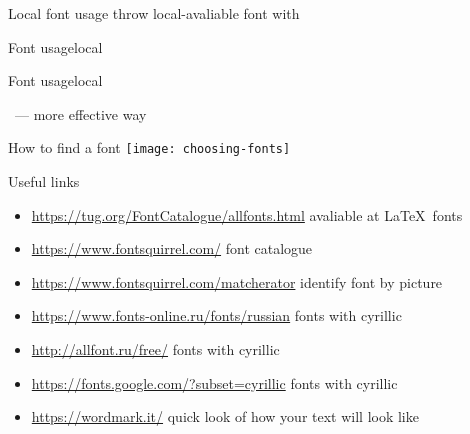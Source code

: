 \begin{frame}

    \magicPage
     \centering\huge Local font usage throw local-avaliable font with \XeLaTeX
\end{frame}

\begin{frame}[fragile]{Font usage\magicPage}{local}\relax

    \ccol{}

\end{frame}

\begin{frame}[fragile]{Font usage\magicPage\preMagicPage}{local}\relax

    \ccol\newfontfamily\ --- more effective way


\end{frame}

\begin{frame}{How to find a font}\relax
\centering
     \texttt{[image: choosing-fonts]}
     
\end{frame}

\begin{frame}{Useful links}\relax
\begin{itemize}
    \item {\csk \url{https://tug.org/FontCatalogue/allfonts.html}} avaliable at \LaTeX\ fonts 
    \item {\csk \url{https://www.fontsquirrel.com/}} font catalogue 
    \item {\csk \url{https://www.fontsquirrel.com/matcherator}} identify font by picture
    \item {\csk \url{https://www.fonts-online.ru/fonts/russian}} fonts with cyrillic 
    \item {\csk \url{http://allfont.ru/free/}} fonts with cyrillic 
    \item {\csk \url{https://fonts.google.com/?subset=cyrillic}} fonts with cyrillic
    \item {\csk \url{https://wordmark.it/}} quick look of how your text will look like
     
\end{itemize}
\end{frame}

